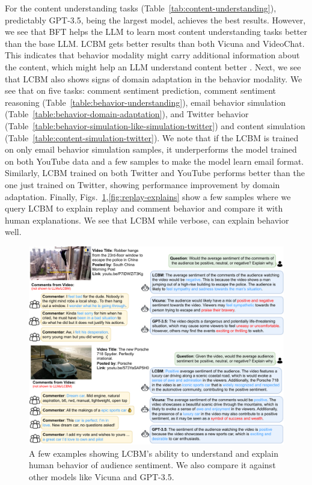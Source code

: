 For the content understanding tasks (Table~\ref{tab:content-understanding}), predictably GPT-3.5, being the largest model, achieves the best results. However, we see that BFT helps the LLM to learn most content understanding tasks better than the base LLM. LCBM gets better results than both Vicuna and VideoChat. This indicates that behavior modality might carry additional information about the content, which might help an LLM understand content better \cite{khurana-etal-2023-synthesizing,klerke-etal-2016-improving,plank2016keystroke}. 
Next, we see that LCBM also shows signs of domain adaptation in the behavior modality. We see that on five tasks: comment sentiment prediction, comment sentiment reasoning (Table~\ref{table:behavior-understanding}), email behavior simulation (Table~\ref{table:behavior-domain-adaptation}), and Twitter behavior (Table~\ref{table:behavior-simulation-like-simulation-twitter}) and content simulation (Table~\ref{table:content-simulation-twitter}). We note that if the LCBM is trained on only email behavior simulation samples, it underperforms the model trained on both YouTube data and a few samples to make the model learn email format. Similarly, LCBM trained on both Twitter and YouTube performs better than the one just trained on Twitter, showing performance improvement by domain adaptation. Finally, Figs.~\ref{fig:comment-explains},\ref{fig:replay-explains} show a few samples where we query LCBM to explain replay and comment behavior and compare it with human explanations. We see that LCBM while verbose, can explain behavior well.

\begin{figure}[!t]
    \centering
    \includegraphics[width=\textwidth]{images/comment-explains-compressed.pdf}
    \caption{A few examples showing LCBM's ability to understand and explain human behavior of audience sentiment. We also compare it against other models like Vicuna and GPT-3.5. \label{fig:comment-explains}}
\end{figure}


